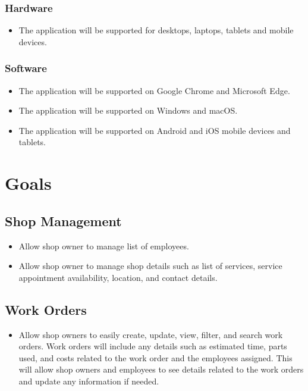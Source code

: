 \documentclass{article}
\begin{document}
\subsubsection{Hardware}
\begin{itemize}
	\item The application will be supported for desktops, laptops, tablets and mobile devices.
\end{itemize}
\subsubsection{Software}
\begin{itemize}
	\item The application will be supported on Google Chrome and Microsoft Edge.
	\item The application will be supported on Windows and macOS.
	\item The application will be supported on Android and iOS mobile devices and tablets.
\end{itemize}

\section{Goals}
\subsection{Shop Management}
\begin{itemize}
	\item Allow shop owner to manage list of employees.
	\item Allow shop owner to manage shop details such as list of services, service appointment availability,
	      location, and contact details.
\end{itemize}

\subsection{Work Orders}
\begin{itemize}
	\item Allow shop owners to easily create, update, view, filter, and search work orders. Work orders will
	      include any details such as estimated time, parts used, and costs related to the work order and the
	      employees assigned. This will allow shop owners and employees to see details related to the work
	      orders and update any information if needed.
\end{itemize}
\end{document}
